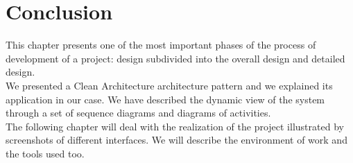 \section*{Conclusion}
This chapter presents one of the most important phases of the process of
development of a project: design subdivided into the overall design
and detailed design.\\
We presented a Clean Architecture architecture pattern and we
explained its application in our case. We have described the dynamic view
of the system through a set of sequence diagrams and diagrams
of activities.\\
The following chapter will deal with the realization of the project illustrated by screenshots of different interfaces. We will describe the environment of
work and the tools used too.